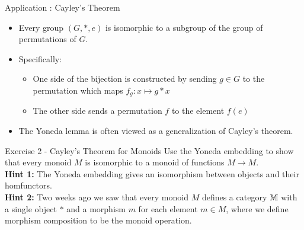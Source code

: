 \begin{frame}{Application : Cayley's Theorem}
\begin{itemize}
	\item Every group $(G, *, e)$ is isomorphic to a subgroup of the group of permutations of $G$.
	\pause\item Specifically:
	\begin{itemize}
		\item One side of the bijection is constructed by sending $g \in G$ to the permutation which maps $f_g : x \mapsto g * x$
		\item The other side sends a permutation $f$ to the element $f(e)$
	\end{itemize}
	\pause\item The Yoneda lemma is often viewed as a generalization of Cayley's theorem.
\end{itemize}
\end{frame}
\begin{frame}{Exercise 2 - Cayley's Theorem for Monoids}
	Use the Yoneda embedding to show that every monoid $M$ is isomorphic to a monoid of functions $M \to M$. 
	\\
	\textbf{Hint 1:} The Yoneda embedding gives an isomorphism between objects and their homfunctors. \\
	\textbf{Hint 2:} Two weeks ago we saw that every monoid $M$ defines a category $\mathbb{M}$ with a single object $*$ and a morphism $m$ for each element $m \in M$, where we define morphism composition to be the monoid operation.
\end{frame}
